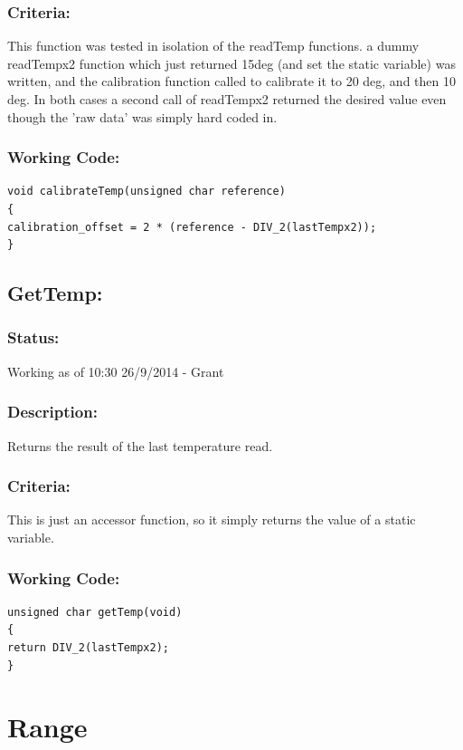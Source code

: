\documentclass[]{report}
\begin{document}
\subsubsection{Criteria:}
This function was tested in isolation of the readTemp functions. a dummy readTempx2 function which just returned 15deg (and set the static variable) was written, and the calibration function called to calibrate it to 20 deg, and then 10 deg. In both cases a second call of readTempx2 returned the desired value even though the 'raw data' was simply hard coded in.

\subsubsection{Working Code:}
\begin{lstlisting}
void calibrateTemp(unsigned char reference)
{
calibration_offset = 2 * (reference - DIV_2(lastTempx2));
}
\end{lstlisting}

\subsection{GetTemp:}

\subsubsection{Status:}
Working as of 10:30 26/9/2014 - Grant

\subsubsection{Description:}
Returns the result of the last temperature read.

\subsubsection{Criteria:}
This is just an accessor function, so it simply returns the value of a static variable.

\subsubsection{Working Code:}
\begin{lstlisting}
unsigned char getTemp(void)
{
return DIV_2(lastTempx2);
}
\end{lstlisting}

\newpage
\section{Range}
\end{document}
